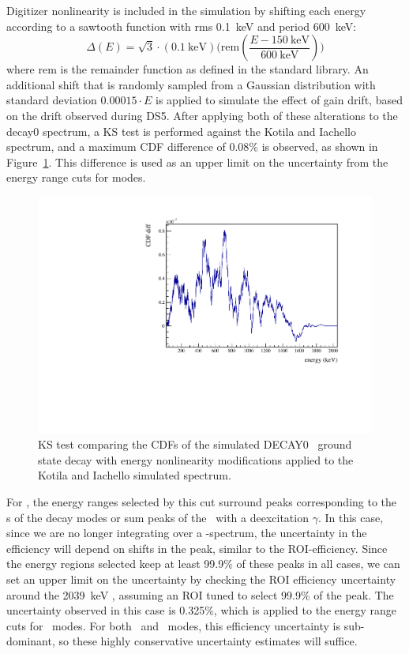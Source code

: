 \documentclass[/main.tex]{subfiles}
\begin{document}
Digitizer nonlinearity is included in the simulation by shifting each energy according to a sawtooth function with rms 0.1~keV and period 600~keV:
\begin{equation}
  \Delta(E) = \sqrt{3}\cdot (0.1~\mathrm{keV}) \big(\mathrm{rem}(\frac{E-150~\mathrm{keV}}{600~\mathrm{keV}}) \big)
\end{equation}
where $\mathrm{rem}$ is the remainder function as defined in the \cpp standard library.
An additional shift that is randomly sampled from a Gaussian distribution with standard deviation $0.00015\cdot E$ is applied to simulate the effect of gain drift, based on the drift observed during DS5.
After applying both of these alterations to the decay0 spectrum, a KS test is performed against the Kotila and Iachello spectrum, and a maximum CDF difference of 0.08\% is observed, as shown in Figure~\ref{fig:decay0NLCks}.
This difference is used as an upper limit on the uncertainty from the energy range cuts for \tnbb modes.
\begin{figure}[h]
  \centering
  \includegraphics[width=0.6\linewidth]{decay0KS}
  \caption[KS Test of decay0 spectrum with energy non-linearities vs Iachello spectrum]{\label{fig:decay0NLCks}
    KS test comparing the CDFs of the simulated DECAY0 \tnbb\ ground state decay with energy nonlinearity modifications applied to the Kotila and Iachello simulated spectrum.
  }
\end{figure}

For \znbb, the energy ranges selected by this cut surround peaks corresponding to the \Qbb s of the decay modes or sum peaks of the \Qbb\ with a deexcitation $\gamma$.
In this case, since we are no longer integrating over a \bb -spectrum, the uncertainty in the efficiency will depend on shifts in the peak, similar to the ROI-efficiency.
Since the energy regions selected keep at least 99.9\% of these peaks in all cases, we can set an upper limit on the uncertainty by checking the ROI efficiency uncertainty around the 2039~keV \Qbb, assuming an ROI tuned to select 99.9\% of the peak.
The uncertainty observed in this case is 0.325\%, which is applied to the energy range cuts for \znbb\ modes.
For both \znbb\ and \tnbb\ modes, this efficiency uncertainty is sub-dominant, so these highly conservative uncertainty estimates will suffice.
\end{document}
